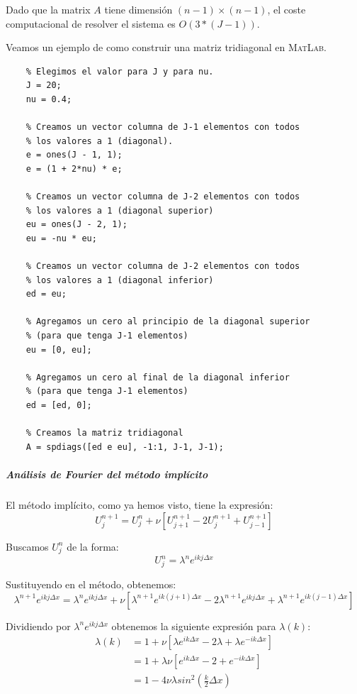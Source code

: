 Dado que la matrix $A$ tiene dimensión $(n-1)\times(n-1)$, el coste computacional de resolver el sistema es $O(3*(J-1))$.

\newpage
Veamos un ejemplo de como construir una matriz tridiagonal en \textsc{MatLab}.
\begin{lstlisting}
	% Elegimos el valor para J y para nu.
	J = 20;
	nu = 0.4;
	
	% Creamos un vector columna de J-1 elementos con todos 
	% los valores a 1 (diagonal).
	e = ones(J - 1, 1);
	e = (1 + 2*nu) * e;
	
	% Creamos un vector columna de J-2 elementos con todos
	% los valores a 1 (diagonal superior)
	eu = ones(J - 2, 1);
	eu = -nu * eu;
	
	% Creamos un vector columna de J-2 elementos con todos 
	% los valores a 1 (diagonal inferior)
	ed = eu;
	
	% Agregamos un cero al principio de la diagonal superior
	% (para que tenga J-1 elementos)
	eu = [0, eu];
	
	% Agregamos un cero al final de la diagonal inferior
	% (para que tenga J-1 elementos)
	ed = [ed, 0];
	
	% Creamos la matriz tridiagonal
	A = spdiags([ed e eu], -1:1, J-1, J-1);
\end{lstlisting}  

\subparagraph{Análisis de Fourier del método implícito}\mbox{}

El método implícito, como ya hemos visto, tiene la expresión:
$$U_j^{n+1} = U_j^n + \nu \left[U_{j+1}^{n+1}-2U_{j}^{n+1}+U_{j-1}^{n+1}\right]$$

Buscamos $U_j^n$ de la forma:
$$U_j^n = \lambda^n e^{ik j\Delta x}$$

Sustituyendo en el método, obtenemos:
$$\lambda^{n+1} e^{ik j\Delta x} = \lambda^n e^{ik j\Delta x} + \nu \left[\lambda^{n+1}e^{ik ({j+1})\Delta x} - 2\lambda^{n+1}e^{ik j\Delta x}+\lambda^{n+1}e^{ik ({j-1})\Delta x}\right]$$

Dividiendo por $\lambda^n e^{ik j\Delta x}$ obtenemos la siguiente expresión para $\lambda(k)$:
\begin{align*}
	\lambda(k) & = 1+\nu\left[\lambda e^{ik\Delta x}-2\lambda + \lambda e^{-ik\Delta x}\right]\\
	& =  1+\lambda \nu\left[e^{ik\Delta x} - 2 + e^{-ik\Delta x}\right]\\
	& = 1-4\nu\lambda sin^2\left(\frac{k}{2}\Delta x\right)\\
\end{align*}

